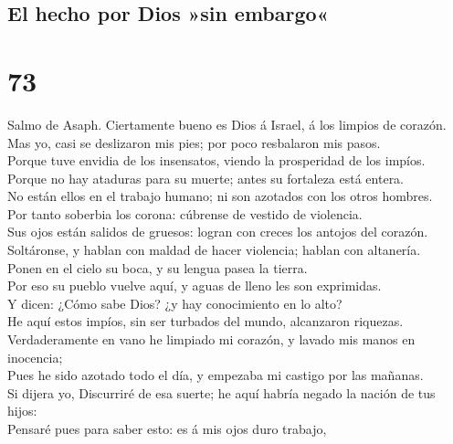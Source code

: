 \hypertarget{el-hecho-por-dios-sin-embargo}{%
\subsection{El hecho por Dios »sin
embargo«}\label{el-hecho-por-dios-sin-embargo}}

\hypertarget{section-72}{%
\section{73}\label{section-72}}

 Salmo de Asaph. Ciertamente bueno es Dios á Israel, á los
limpios de corazón.\\
 Mas yo, casi se deslizaron mis pies; por poco resbalaron
mis pasos.\\
 Porque tuve envidia de los insensatos, viendo la
prosperidad de los impíos.\\
 Porque no hay ataduras para su muerte; antes su fortaleza
está entera.\\
 No están ellos en el trabajo humano; ni son azotados con
los otros hombres.\\
 Por tanto soberbia los corona: cúbrense de vestido de
violencia.\\
 Sus ojos están salidos de gruesos: logran con creces los
antojos del corazón.\\
 Soltáronse, y hablan con maldad de hacer violencia;
hablan con altanería.\\
 Ponen en el cielo su boca, y su lengua pasea la tierra.\\
 Por eso su pueblo vuelve aquí, y aguas de lleno les son
exprimidas.\\
 Y dicen: ¿Cómo sabe Dios? ¿y hay conocimiento en lo
alto?\\
 He aquí estos impíos, sin ser turbados del mundo,
alcanzaron riquezas.\\
 Verdaderamente en vano he limpiado mi corazón, y lavado
mis manos en inocencia;\\
 Pues he sido azotado todo el día, y empezaba mi castigo
por las mañanas.\\
 Si dijera yo, Discurriré de esa suerte; he aquí habría
negado la nación de tus hijos:\\
 Pensaré pues para saber esto: es á mis ojos duro
trabajo,\\
